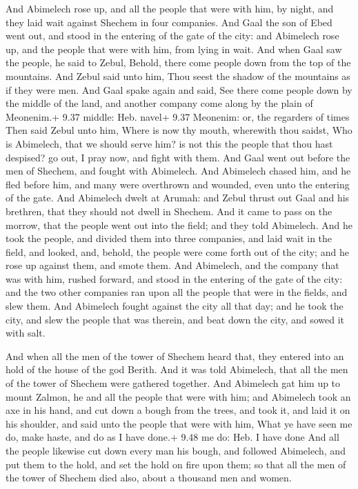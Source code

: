  And Abimelech rose up, and all the people that were with
him, by night, and they laid wait against Shechem in four companies.
 And Gaal the son of Ebed went out, and stood in the
entering of the gate of the city: and Abimelech rose up, and the people
that were with him, from lying in wait.  And when Gaal saw
the people, he said to Zebul, Behold, there come people down from the
top of the mountains. And Zebul said unto him, Thou seest the shadow of
the mountains as if they were men.  And Gaal spake again
and said, See there come people down by the middle of the land, and
another company come along by the plain of Meonenim.+ 9.37 middle: Heb.
navel+ 9.37 Meonenim: or, the regarders of times  Then said
Zebul unto him, Where is now thy mouth, wherewith thou saidst, Who is
Abimelech, that we should serve him? is not this the people that thou
hast despised? go out, I pray now, and fight with them. 
And Gaal went out before the men of Shechem, and fought with Abimelech.
 And Abimelech chased him, and he fled before him, and many
were overthrown and wounded, even unto the entering of the gate.
 And Abimelech dwelt at Arumah: and Zebul thrust out Gaal
and his brethren, that they should not dwell in Shechem. 
And it came to pass on the morrow, that the people went out into the
field; and they told Abimelech.  And he took the people,
and divided them into three companies, and laid wait in the field, and
looked, and, behold, the people were come forth out of the city; and he
rose up against them, and smote them.  And Abimelech, and
the company that was with him, rushed forward, and stood in the entering
of the gate of the city: and the two other companies ran upon all the
people that were in the fields, and slew them.  And
Abimelech fought against the city all that day; and he took the city,
and slew the people that was therein, and beat down the city, and sowed
it with salt.

 And when all the men of the tower of Shechem heard that,
they entered into an hold of the house of the god Berith. 
And it was told Abimelech, that all the men of the tower of Shechem were
gathered together.  And Abimelech gat him up to mount
Zalmon, he and all the people that were with him; and Abimelech took an
axe in his hand, and cut down a bough from the trees, and took it, and
laid it on his shoulder, and said unto the people that were with him,
What ye have seen me do, make haste, and do as I have done.+ 9.48 me do:
Heb. I have done  And all the people likewise cut down
every man his bough, and followed Abimelech, and put them to the hold,
and set the hold on fire upon them; so that all the men of the tower of
Shechem died also, about a thousand men and women.

